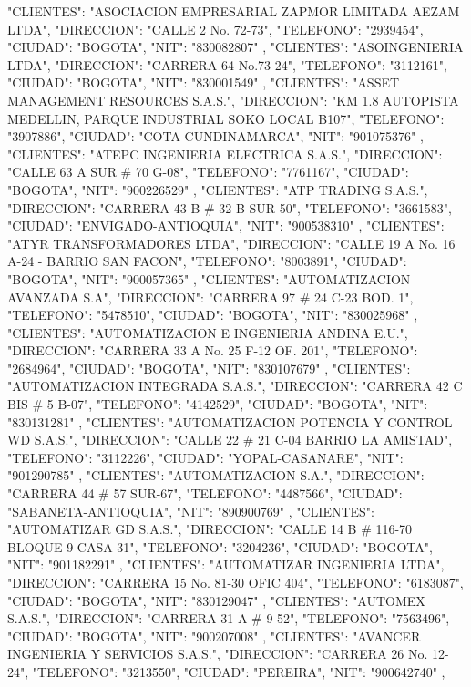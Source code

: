    {
   "CLIENTES": "ASOCIACION EMPRESARIAL ZAPMOR LIMITADA AEZAM LTDA",
   "DIRECCION": "CALLE 2 No. 72-73",
   "TELEFONO": "2939454",
   "CIUDAD": "BOGOTA",
   "NIT": "830082807"
   },
   {
   "CLIENTES": "ASOINGENIERIA LTDA",
   "DIRECCION": "CARRERA 64 No.73-24",
   "TELEFONO": "3112161",
   "CIUDAD": "BOGOTA",
   "NIT": "830001549"
   },
   {
   "CLIENTES": "ASSET MANAGEMENT RESOURCES S.A.S.",
   "DIRECCION": "KM 1.8 AUTOPISTA MEDELLIN, PARQUE INDUSTRIAL SOKO LOCAL B107",
   "TELEFONO": "3907886",
   "CIUDAD": "COTA-CUNDINAMARCA",
   "NIT": "901075376"
   },
   {
   "CLIENTES": "ATEPC INGENIERIA ELECTRICA S.A.S.",
   "DIRECCION": "CALLE 63 A SUR # 70 G-08",
   "TELEFONO": "7761167",
   "CIUDAD": "BOGOTA",
   "NIT": "900226529"
   },
   {
   "CLIENTES": "ATP TRADING S.A.S.",
   "DIRECCION": "CARRERA 43 B # 32 B SUR-50",
   "TELEFONO": "3661583",
   "CIUDAD": "ENVIGADO-ANTIOQUIA",
   "NIT": "900538310"
   },
   {
   "CLIENTES": "ATYR TRANSFORMADORES LTDA",
   "DIRECCION": "CALLE 19 A No. 16 A-24 - BARRIO SAN FACON",
   "TELEFONO": "8003891",
   "CIUDAD": "BOGOTA",
   "NIT": "900057365"
   },
   {
   "CLIENTES": "AUTOMATIZACION AVANZADA S.A",
   "DIRECCION": "CARRERA 97 # 24 C-23 BOD. 1",
   "TELEFONO": "5478510",
   "CIUDAD": "BOGOTA",
   "NIT": "830025968"
   },
   {
   "CLIENTES": "AUTOMATIZACION E INGENIERIA ANDINA E.U.",
   "DIRECCION": "CARRERA 33 A No. 25 F-12 OF. 201",
   "TELEFONO": "2684964",
   "CIUDAD": "BOGOTA",
   "NIT": "830107679"
   },
   {
   "CLIENTES": "AUTOMATIZACION INTEGRADA S.A.S.",
   "DIRECCION": "CARRERA 42 C BIS # 5 B-07",
   "TELEFONO": "4142529",
   "CIUDAD": "BOGOTA",
   "NIT": "830131281"
   },
   {
   "CLIENTES": "AUTOMATIZACION POTENCIA Y CONTROL WD S.A.S.",
   "DIRECCION": "CALLE 22 # 21 C-04 BARRIO LA AMISTAD",
   "TELEFONO": "3112226",
   "CIUDAD": "YOPAL-CASANARE",
   "NIT": "901290785"
   },
   {
   "CLIENTES": "AUTOMATIZACION S.A.",
   "DIRECCION": "CARRERA 44 # 57 SUR-67",
   "TELEFONO": "4487566",
   "CIUDAD": "SABANETA-ANTIOQUIA",
   "NIT": "890900769"
   },
   {
   "CLIENTES": "AUTOMATIZAR GD S.A.S.",
   "DIRECCION": "CALLE 14 B # 116-70 BLOQUE 9 CASA 31",
   "TELEFONO": "3204236",
   "CIUDAD": "BOGOTA",
   "NIT": "901182291"
   },
   {
   "CLIENTES": "AUTOMATIZAR INGENIERIA LTDA",
   "DIRECCION": "CARRERA 15 No. 81-30 OFIC 404",
   "TELEFONO": "6183087",
   "CIUDAD": "BOGOTA",
   "NIT": "830129047"
   },
   {
   "CLIENTES": "AUTOMEX S.A.S.",
   "DIRECCION": "CARRERA 31 A # 9-52",
   "TELEFONO": "7563496",
   "CIUDAD": "BOGOTA",
   "NIT": "900207008"
   },
   {
   "CLIENTES": "AVANCER INGENIERIA Y SERVICIOS S.A.S.",
   "DIRECCION": "CARRERA 26 No. 12-24",
   "TELEFONO": "3213550",
   "CIUDAD": "PEREIRA",
   "NIT": "900642740"
   },
